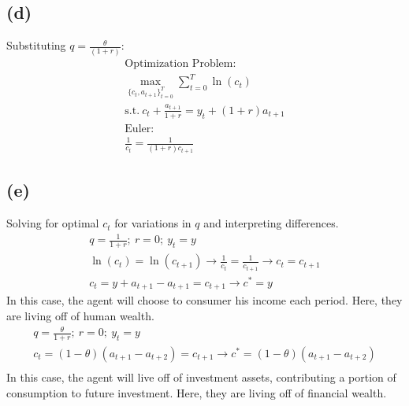 \documentclass[10pt,a4paper]{article}
\newcommand{\sumt}{\sum\limits_{t=0}^{T}}
\begin{document}
    \subsection*{(d)}
        Substituting $q = \frac{\theta}{(1+r)}$:
        \begin{gather*}
            \text{Optimization Problem:} \\
            \max_{\{c_t,a_{t+1}\}_{t=0}^{T}}\sumt\ln(c_t) \\
            \text{s.t.} \ c_t + \frac{a_{t+1}}{1+r} = y_t + (1+r)a_{t+1} \\
            \text{Euler:} \\
            \frac{1}{c_t} = \frac{1}{(1+r)c_{t+1}}
        \end{gather*}
    \subsection*{(e)}
        Solving for optimal $c_t$ for variations in $q$ and interpreting differences.
        \begin{gather*}
            q = \frac{1}{1+r}; \ r=0; \ y_t = y \\
            \ln(c_t) = \ln(c_{t+1}) \rightarrow \frac{1}{c_t} = \frac{1}{c_{t+1}} \rightarrow c_t = c_{t+1} \\
            c_t = y + a_{t+1} - a_{t+1} = c_{t+1} \rightarrow c^* = y
        \end{gather*}
        In this case, the agent will choose to consumer his income each period. Here, they are living off of human wealth.
        \begin{gather*}
            q = \frac{\theta}{1+r}; \ r=0; \ y_t = y \\
            c_t = (1-\theta)(a_{t+1} - a_{t+2}) = c_{t+1} \rightarrow c^* = (1-\theta)(a_{t+1} - a_{t+2}) \\
        \end{gather*}
        In this case, the agent will live off of investment assets, contributing a portion of consumption to future investment.
        Here, they are living off of financial wealth.
\end{document}
